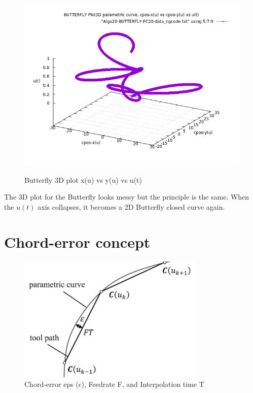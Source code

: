 \clearpage
\pagebreak

\begin{figure}
	\includegraphics[width=1.10\textwidth]{Chap4/images/BUTTERFLY-plot-3D-x-vs-y-vs-u.png} 
	\label{BUTTERFLY-plot3D-data_ngcode.png}
	\caption{Butterfly 3D plot x(u) vs y(u) vs u(t)}
\end{figure}


The 3D plot for the Butterfly looks messy but the principle is the same. When the $u(t)$ axis collapses, it becomes a 2D Butterfly closed curve again.


\clearpage
\pagebreak

\section{Chord-error concept}

\begin{figure}
	\caption{Chord-error eps ($\epsilon$), Feedrate F, and Interpolation time T}
	\label{Chord-error-image.png}
	\centering
	\includegraphics[width=0.80\textwidth]{Images/Chap3/Chord-error-image.png} 


\end{figure}

